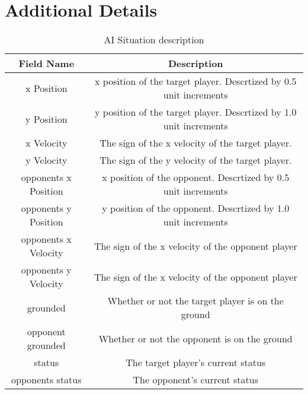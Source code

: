 
\chapter{Additional Details}

\begin{table}[h]
	\centering
	\caption{AI Situation description}
	\begin{tabular}{| c | c |}
		\hline
		Field Name & Description \\
		\hline
		x Position        & x position of the target player. Descrtized by 0.5 unit increments	\\
		\hline
		y Position        & y position of the target player. Descrtized by 1.0 unit increments 	\\
		\hline
		x Velocity        & The sign of the x velocity of the target player.	\\
		\hline
		y Velocity        & The sign of the y velocity of the target player.	\\
		\hline
		opponents x Position        & x position of the opponent. Descrtized by 0.5 unit increments 	\\
		\hline
		opponents y Position        & y position of the opponent. Descrtized by 1.0 unit increments  	\\
		\hline
		opponents x Velocity        & The sign of the x velocity of the opponent player 	\\
		\hline
		opponents y Velocity        & The sign of the x velocity of the opponent player	\\
		\hline
		grounded        & Whether or not the target player is on the ground 	\\
		\hline
		opponent grounded       & Whether or not the opponent is on the ground  	\\
		\hline
		status        & The target player's current status 	\\
		\hline
		opponents status        & The opponent's current status 	\\
		\hline
	\end{tabular}
	\label{gamestate}
\end{table}

